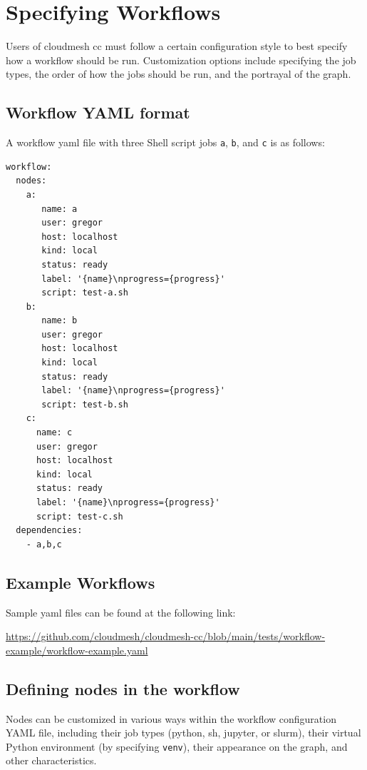 
\section{Specifying Workflows}\label{specifying-workflows}

Users of cloudmesh cc must follow a certain configuration style to best
specify how a workflow should be run. Customization options include
specifying the job types, the order of how the jobs should be run, and
the portrayal of the graph.

\subsection{Workflow YAML format}\label{workflow-yaml-format}

A workflow yaml file with three Shell script jobs \texttt{a},
\texttt{b}, and \texttt{c} is as follows:

\begin{verbatim}
workflow:
  nodes:
    a:
       name: a
       user: gregor
       host: localhost
       kind: local
       status: ready
       label: '{name}\nprogress={progress}'
       script: test-a.sh
    b:
       name: b
       user: gregor
       host: localhost
       kind: local
       status: ready
       label: '{name}\nprogress={progress}'
       script: test-b.sh
    c:
      name: c
      user: gregor
      host: localhost
      kind: local
      status: ready
      label: '{name}\nprogress={progress}'
      script: test-c.sh
  dependencies:
    - a,b,c
\end{verbatim}

\subsection{Example Workflows}\label{example-workflows}

Sample yaml files can be found at the following link:

\url{https://github.com/cloudmesh/cloudmesh-cc/blob/main/tests/workflow-example/workflow-example.yaml}

\subsection{Defining nodes in the
workflow}\label{defining-nodes-in-the-workflow}

Nodes can be customized in various ways within the workflow
configuration YAML file, including their job types (python, sh, jupyter,
or slurm), their virtual Python environment (by specifying
\texttt{venv}), their appearance on the graph, and other
characteristics.


